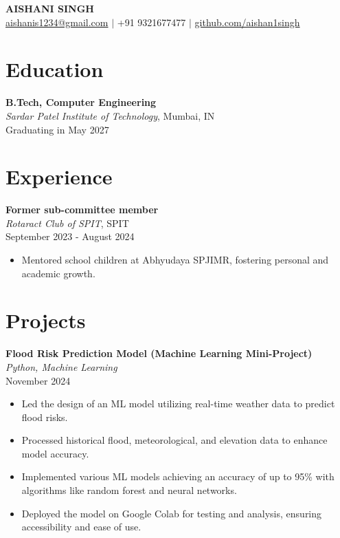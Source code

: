 \documentclass[letterpaper,10pt]{article}
\begin{document}
\begin{center}
    \textbf{\Huge AISHANI SINGH} \\
    \href{mailto:aishanis1234@gmail.com}{aishanis1234@gmail.com} $\vert$ +91 9321677477 $\vert$ \href{github.com/aishan1singh}{github.com/aishan1singh}
\end{center}

\section*{Education}
\textbf{B.Tech, Computer Engineering} \\
\textit{Sardar Patel Institute of Technology}, Mumbai, IN \\
Graduating in May 2027

\section*{Experience}
\textbf{Former sub-committee member} \\
\textit{Rotaract Club of SPIT}, SPIT \\
September 2023 - August 2024
\begin{itemize}
    \item Mentored school children at Abhyudaya SPJIMR, fostering personal and academic growth.
\end{itemize}

\section*{Projects}
\textbf{Flood Risk Prediction Model (Machine Learning Mini-Project)} \\
\textit{Python, Machine Learning} \\
November 2024
\begin{itemize}
    \item Led the design of an ML model utilizing real-time weather data to predict flood risks.
    \item Processed historical flood, meteorological, and elevation data to enhance model accuracy.
    \item Implemented various ML models achieving an accuracy of up to 95\% with algorithms like random forest and neural networks.
    \item Deployed the model on Google Colab for testing and analysis, ensuring accessibility and ease of use.
\end{itemize}
\end{document}
